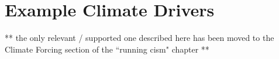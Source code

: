 \section{Example Climate Drivers}

** the only relevant / supported one described here has been moved to the Climate Forcing section of the ``running cism" chapter **

%
%
